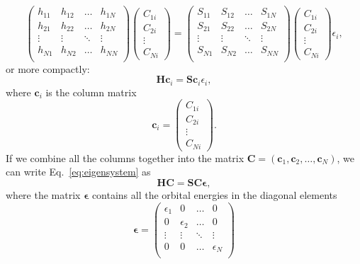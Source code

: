 \documentclass[../Main/chem532-notes.tex]{subfiles}
\begin{document}
\begin{equation}
\begin{pmatrix}
h_{11} & h_{12} & \ldots & h_{1N} \\
h_{21} & h_{22} & \ldots & h_{2N} \\
\vdots & \vdots & \ddots & \vdots \\
h_{N1} & h_{N2} & \ldots & h_{NN} \\
\end{pmatrix}
\begin{pmatrix}
C_{1i} \\
C_{2i} \\
\vdots \\
C_{Ni}
\end{pmatrix}
= 
\begin{pmatrix}
S_{11} & S_{12} & \ldots & S_{1N} \\
S_{21} & S_{22} & \ldots & S_{2N} \\
\vdots & \vdots & \ddots & \vdots \\
S_{N1} & S_{N2} & \ldots & S_{NN} \\
\end{pmatrix}
\begin{pmatrix}
C_{1i} \\
C_{2i} \\
\vdots \\
C_{Ni}
\end{pmatrix}
\epsilon_i,
\end{equation}
or more compactly:
\begin{equation} \label{eq:eigensystem}
\mathbf{H} \mathbf{c}_i = \mathbf{S} \mathbf{c}_i \epsilon_i,
\end{equation}
where $\mathbf{c}_i$ is the column matrix 
\begin{equation}
\mathbf{c}_i = 
\begin{pmatrix}
C_{1i} \\
C_{2i} \\
\vdots \\
C_{Ni}
\end{pmatrix}.
\end{equation}
If we combine all the columns together into the matrix $\mathbf{C} = (\mathbf{c}_1, \mathbf{c}_2, \ldots, \mathbf{c}_N)$, we can write Eq.~\eqref{eq:eigensystem} as
\begin{equation} \label{eq:eigensystem_matrix}
\mathbf{H} \mathbf{C} = \mathbf{S} \mathbf{C} \boldsymbol{\epsilon},
\end{equation}
where the matrix $\boldsymbol{\epsilon}$ contains all the orbital energies in the diagonal elements
\begin{equation}
\boldsymbol{\epsilon} = \begin{pmatrix}
\epsilon_{1} &0 & \ldots & 0 \\
0 & \epsilon_{2} & \ldots & 0 \\
\vdots & \vdots & \ddots & \vdots \\
0 & 0 & \ldots & \epsilon_{N} \\
\end{pmatrix}
\end{equation}
\end{document}
